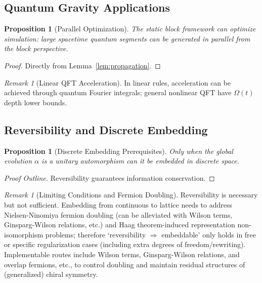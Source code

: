 \documentclass[11pt]{article}
\newtheorem{proposition}[theorem]{Proposition}
\theoremstyle{definition}
\theoremstyle{remark}
\newtheorem{remark}[theorem]{Remark}
\begin{document}
\subsection{Quantum Gravity Applications}

\begin{proposition}[Parallel Optimization]\label{prop:parallel}
The static block framework can optimize simulation: large spacetime quantum segments can be generated in parallel from the block perspective.
\end{proposition}

\begin{proof}
Directly from Lemma~\ref{lem:propagation}.
\end{proof}

\begin{remark}[Linear QFT Acceleration]
In linear rules, acceleration can be achieved through quantum Fourier integrals; general nonlinear QFT have \( \Omega(t) \) depth lower bounds.
\end{remark}

\subsection{Reversibility and Discrete Embedding}

\begin{proposition}[Discrete Embedding Prerequisites]\label{prop:discrete}
Only when the global evolution \( \alpha \) is a unitary automorphism can it be embedded in discrete space.
\end{proposition}

\begin{proof}[Proof Outline]
Reversibility guarantees information conservation.
\end{proof}

\begin{remark}[Limiting Conditions and Fermion Doubling]
Reversibility is necessary but not sufficient. Embedding from continuous to lattice needs to address Nielsen-Ninomiya fermion doubling (can be alleviated with Wilson terms, Ginsparg-Wilson relations, etc.) and Haag theorem-induced representation non-isomorphism problems; therefore `reversibility \( \Rightarrow \) embeddable' only holds in free or specific regularization cases (including extra degrees of freedom/rewriting). Implementable routes include Wilson terms, Ginsparg-Wilson relations, and overlap fermions, etc., to control doubling and maintain residual structures of (generalized) chiral symmetry.
\end{remark}
\end{document}
